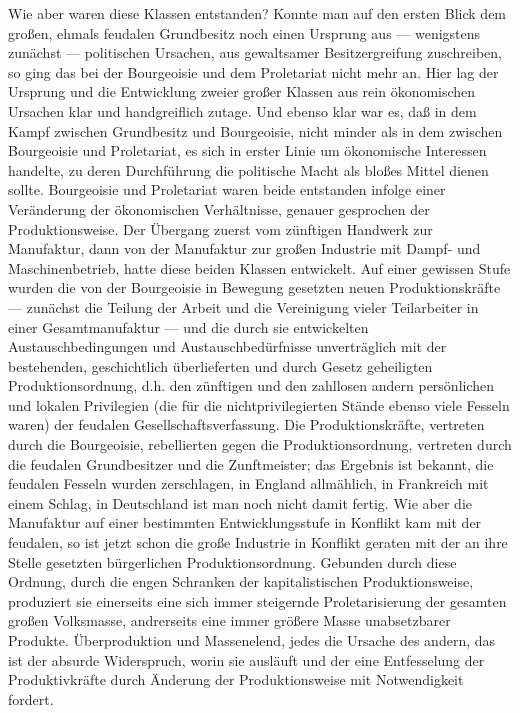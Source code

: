 Wie aber waren diese Klassen entstanden? Konnte man auf den
ersten Blick dem großen, ehmals feudalen Grundbesitz noch einen Ursprung
aus --- wenigstens zunächst --- politischen Ursachen, aus gewaltsamer
Besitzergreifung zuschreiben, so ging das bei der Bourgeoisie und dem
Proletariat nicht mehr an. Hier lag der Ursprung und die Entwicklung
zweier großer Klassen aus rein ökonomischen Ursachen klar und
handgreiflich zutage. Und ebenso klar war es, daß in dem Kampf zwischen
Grundbesitz und Bourgeoisie, nicht minder als in dem zwischen
Bourgeoisie und Proletariat, es sich in erster Linie um ökonomische
Interessen handelte, zu deren Durchführung die politische Macht als
bloßes Mittel dienen sollte. Bourgeoisie und Proletariat waren beide
entstanden infolge einer Veränderung der ökonomischen Verhältnisse,
genauer gesprochen der Produktionsweise. Der Übergang zuerst vom
zünftigen Handwerk zur Manufaktur, dann von der Manufaktur zur großen
Industrie mit Dampf- und Maschinenbetrieb, hatte diese beiden Klassen
entwickelt. Auf einer gewissen Stufe wurden die von der Bourgeoisie in
Bewegung gesetzten neuen Produktionskräfte --- zunächst die Teilung der
Arbeit und die Vereinigung vieler Teilarbeiter in einer Gesamtmanufaktur
--- und die durch sie entwickelten Austauschbedingungen und
Austauschbedürfnisse unverträglich mit der bestehenden, geschichtlich
überlieferten und durch Gesetz geheiligten Produktionsordnung, d.h. den
zünftigen und den zahllosen andern persönlichen und lokalen
Privilegien (die für die
nichtprivilegierten Stände ebenso viele Fesseln waren) der feudalen
Gesellschaftsverfassung. Die Produktionskräfte, vertreten durch die
Bourgeoisie, rebellierten gegen die Produktionsordnung, vertreten durch
die feudalen Grundbesitzer und die Zunftmeister; das Ergebnis ist
bekannt, die feudalen Fesseln wurden zerschlagen, in England allmählich,
in Frankreich mit einem Schlag, in Deutschland ist man noch nicht damit
fertig. Wie aber die Manufaktur auf einer bestimmten Entwicklungsstufe
in Konflikt kam mit der feudalen, so ist jetzt schon die große Industrie
in Konflikt geraten mit der an ihre Stelle gesetzten bürgerlichen
Produktionsordnung. Gebunden durch diese Ordnung, durch die engen
Schranken der kapitalistischen Produktionsweise, produziert sie
einerseits eine sich immer steigernde Proletarisierung der gesamten
großen Volksmasse, andrerseits eine immer größere Masse unabsetzbarer
Produkte. Überproduktion und Massenelend, jedes die Ursache des andern,
das ist der absurde Widerspruch, worin sie ausläuft und der eine
Entfesselung der Produktivkräfte durch Änderung der Produktionsweise mit
Notwendigkeit fordert.

